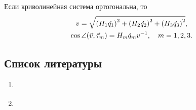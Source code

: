 Если криволинейная система ортогональна, то
\begin{equation}
  \begin{gathered}
    v = \sqrt{\left( H_1 \dot{q_1} \right)^2 + \left( H_2 \dot{q_2} \right)^2 + \left( H_3
      \dot{q_3} \right)^2}, \\
    \cos\angle (\vec{v}, \vec{\tau}_m) = H_m \dot{q}_m v^{-1}, \quad m = 1,2,3.
  \end{gathered}
\end{equation}

\subsection{Список литературы}
\begin{enumerate}
  \item \cite{lectures}
  \item \cite{lourie}
\end{enumerate}

